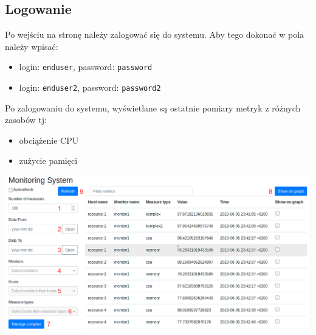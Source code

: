 \documentclass{article}
\begin{document}
\subsection{Logowanie}
Po wejściu na stronę należy zalogować się do systemu. Aby tego dokonać w pola należy wpisać:
\begin{itemize}
\item login: \texttt{enduser}, password: \texttt{password}
\item login: \texttt{enduser2}, password: \texttt{password2}
\end{itemize}
Po zalogowaniu do systemu, wyświetlane są ostatnie pomiary metryk z różnych zasobów tj:
\begin{itemize}
\item obciążenie CPU
\item zużycie pamięci
\end{itemize}
\includegraphics[width=\linewidth]{../screen/ResourceMonitor.png}

\newpage
\end{document}

